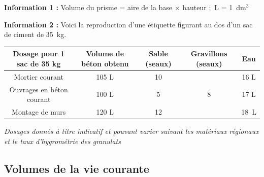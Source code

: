 \documentclass[11pt]{article}
\begin{document}
\textbf{Information 1 :} Volume du prisme = aire de la base $\times$ hauteur ;~L = 1~dm$^3$

\textbf{Information 2 :} Voici la reproduction d'une étiquette figurant au dos d'un sac de ciment
de 35~kg.

\begin{center}
  \begin{tabular}{|c|c|c|c|c|}  \hline
    Dosage pour 1 sac de 35 kg	&Volume de béton obtenu	&Sable (seaux)	&Gravillons (seaux)	&Eau\\ \hline
    Mortier courant 			&105 L					&10				&					&16 L\\ \hline
    Ouvrages en béton courant	&100 L					&5				&8 					&17 L\\ \hline
    Montage de murs 			&120 L 					&12				&					&18~L\\ \hline
  \end{tabular}
\end{center}
\textit{Dosages donnés à titre indicatif et pouvant varier suivant les matériaux régionaux et le taux d'hygrométrie des granulats}



\subsection*{Volumes de la vie courante}
\end{document}
